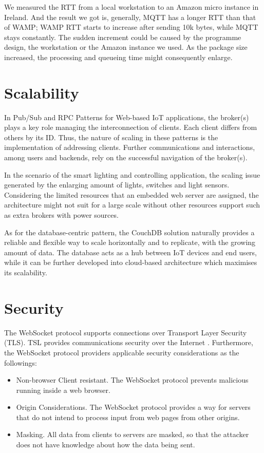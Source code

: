 We measured the RTT from a local workstation to an Amazon micro instance in Ireland. And the result we got is, generally, MQTT has a longer RTT than that of WAMP; WAMP RTT starts to increase after sending 10k bytes, while MQTT stays constantly. The sudden increment could be caused by the programme design, the workstation or the Amazon instance we used. As the package size increased, the processing and queueing time might consequently enlarge. 

\section{Scalability}
In Pub/Sub and RPC Patterns for Web-based IoT applications, the broker(s) plays a key role managing the interconnection of clients. Each client differs from others by its ID. Thus, the nature of scaling in these patterns is the implementation of addressing clients. Further communications and interactions, among users and backends, rely on the successful navigation of the broker(s).

In the scenario of the smart lighting and controlling application, the scaling issue generated by the enlarging amount of lights, switches and light sensors. Considering the limited resources that an embedded web server are assigned, the architecture might not suit for a large scale without other resources support such as extra brokers with power sources.

As for the database-centric pattern, the CouchDB solution naturally provides a reliable and flexible way to scale horizontally and to replicate, with the growing amount of data. The database acts as a hub between IoT devices and end users, while it can be further developed into cloud-based architecture which maximises its scalability. 

\section{Security}
The WebSocket protocol supports connections over Transport Layer Security (TLS). TSL provides communications security over the Internet \cite{dierks2008rfc}. Furthermore, the WebSocket protocol providers applicable security considerations as the followings\cite{rfc64552012web}: 

\begin{itemize}
\setlength{\itemsep}{0pt}
\item Non-browser Client resistant. The WebSocket protocol prevents malicious running inside a web browser. 
\item Origin Considerations. The WebSocket protocol provides a way for servers that do not intend to process input from web pages from other origins.
\item Masking. All data from clients to servers are masked, so that the attacker does not have knowledge about how the data being sent.
\end{itemize}

